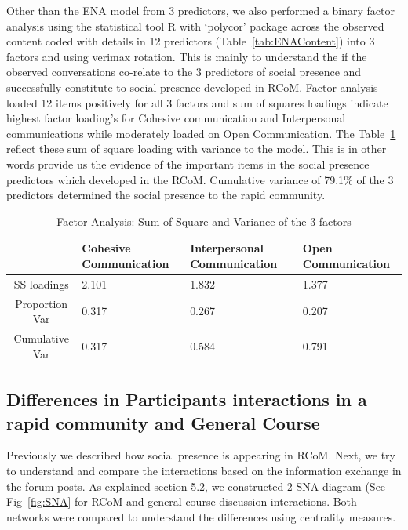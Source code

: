 \documentclass[format=acmsmall, review=false, screen=true]{acmart}
\begin{document}
Other than the ENA model from 3 predictors, we also performed a binary factor analysis using the statistical tool R with ‘polycor’ package across the observed content coded with details in 12 predictors (Table~\ref{tab:ENAContent}) into 3 factors and using verimax rotation. This is mainly to understand the if the observed conversations co-relate to the 3 predictors of social presence and successfully constitute to social presence developed in RCoM. Factor analysis loaded 12 items positively for all 3 factors and sum of squares loadings indicate highest factor loading's for Cohesive communication and Interpersonal communications while moderately loaded on Open Communication. The Table~\ref{tab:FA} reflect these sum of square loading with variance to the model. This is in other words provide us the evidence of the important items in the social presence predictors which developed in the RCoM. Cumulative variance of 79.1\% of the 3 predictors determined the social presence to the rapid community. 

\begin{table}[h!]
\caption{Factor Analysis: Sum of Square and Variance of the 3 factors }
\label{tab:FA}
\centering
 \begin{tabular}{c|p{2cm}|p{2cm}|p{2cm}}
 \toprule
 & Cohesive Communication & Interpersonal Communication & Open Communication \\
 \midrule
 SS loadings & 2.101 & 1.832 & 1.377 \\
 Proportion Var & 0.317 & 0.267 & 0.207 \\
 Cumulative Var & 0.317 & 0.584 & 0.791 \\
 \bottomrule
 \end{tabular}
 \end{table}

\subsection{Differences in Participants interactions in a rapid community and General Course}

Previously we described how social presence is appearing in RCoM. Next, we try to understand and compare the interactions based on the information exchange in the forum posts. As explained section 5.2, we constructed 2 SNA diagram (See Fig~\ref{fig:SNA} for RCoM and general course discussion interactions. Both networks were compared to understand the differences using centrality measures. 
\end{document}

